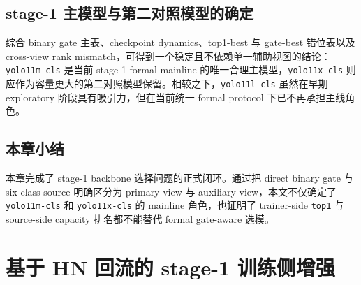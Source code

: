 \documentclass[UTF8,openany,12pt]{ctexbook}
\newcommand{\formalmetric}[1]{\texttt{#1}}
\begin{document}
\section{stage-1 主模型与第二对照模型的确定}
综合 binary gate 主表、checkpoint dynamics、top1-best 与 gate-best 错位表以及 cross-view rank mismatch，可得到一个稳定且不依赖单一辅助视图的结论：\texttt{yolo11m-cls} 是当前 stage-1 formal mainline 的唯一合理主模型，\texttt{yolo11x-cls} 则应作为容量更大的第二对照模型保留。相较之下，\texttt{yolo11l-cls} 虽然在早期 exploratory 阶段具有吸引力，但在当前统一 formal protocol 下已不再承担主线角色。

\section{本章小结}
本章完成了 stage-1 backbone 选择问题的正式闭环。通过把 direct binary gate 与 six-class source 明确区分为 primary view 与 auxiliary view，本文不仅确定了 \texttt{yolo11m-cls} 和 \texttt{yolo11x-cls} 的 mainline 角色，也证明了 trainer-side \formalmetric{top1} 与 source-side capacity 排名都不能替代 formal gate-aware 选模。

\chapter{基于 HN 回流的 stage-1 训练侧增强}
\end{document}
